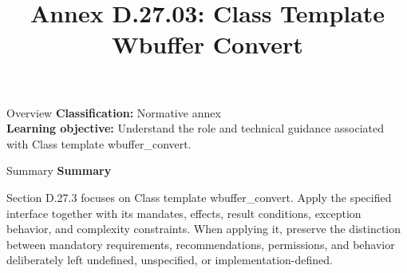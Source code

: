 \documentclass[10pt,letterpaper]{article}
\title{Annex D.27.03: Class Template Wbuffer Convert}
\author{}
\date{}
\begin{document}
\maketitle
\begin{CornellOverviewBox}{Overview}
\textbf{Classification:} Normative annex\\[2pt]
\textbf{Learning objective:} Understand the role and technical guidance associated with Class template wbuffer\_convert.
\end{CornellOverviewBox}\begin{CornellSummaryBox}{Summary}
{\sffamily\bfseries\color{Accent} Summary}\par\vspace{3pt}Section D.27.3 focuses on Class template wbuffer\_convert. Apply the specified interface together with its mandates, effects, result conditions, exception behavior, and complexity constraints. When applying it, preserve the distinction between mandatory requirements, recommendations, permissions, and behavior deliberately left undefined, unspecified, or implementation-defined.
\end{CornellSummaryBox}
\end{document}
